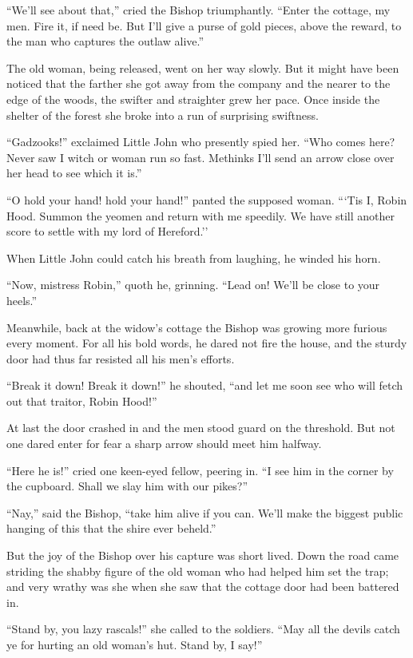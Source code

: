 ``We'll see about that,'' cried the Bishop triumphantly. ``Enter the
cottage, my men. Fire it, if need be. But I'll give a purse of gold
pieces, above the reward, to the man who captures the outlaw alive.''

The old woman, being released, went on her way slowly. But it might have
been noticed that the farther she got away from the company and the
nearer to the edge of the woods, the swifter and straighter grew her
pace. Once inside the shelter of the forest she broke into a run of
surprising swiftness.

``Gadzooks!'' exclaimed Little John who presently spied her. ``Who comes
here? Never saw I witch or woman run so fast. Methinks I'll send an
arrow close over her head to see which it is.''

``O hold your hand! hold your hand!'' panted the supposed woman. ```Tis
I, Robin Hood. Summon the yeomen and return with me speedily. We have
still another score to settle with my lord of Hereford.''

When Little John could catch his breath from laughing, he winded his
horn.

``Now, mistress Robin,'' quoth he, grinning. ``Lead on! We'll be close
to your heels.''

Meanwhile, back at the widow's cottage the Bishop was growing more
furious every moment. For all his bold words, he dared not fire the
house, and the sturdy door had thus far resisted all his men's efforts.

``Break it down! Break it down!'' he shouted, ``and let me soon see who
will fetch out that traitor, Robin Hood!''

At last the door crashed in and the men stood guard on the threshold.
But not one dared enter for fear a sharp arrow should meet him halfway.

``Here he is!'' cried one keen-eyed fellow, peering in. ``I see him in
the corner by the cupboard. Shall we slay him with our pikes?''

``Nay,'' said the Bishop, ``take him alive if you can. We'll make the
biggest public hanging of this that the shire ever beheld.''

But the joy of the Bishop over his capture was short lived. Down the
road came striding the shabby figure of the old woman who had helped him
set the trap; and very wrathy was she when she saw that the cottage door
had been battered in.

``Stand by, you lazy rascals!'' she called to the soldiers. ``May all
the devils catch ye for hurting an old woman's hut. Stand by, I say!''

